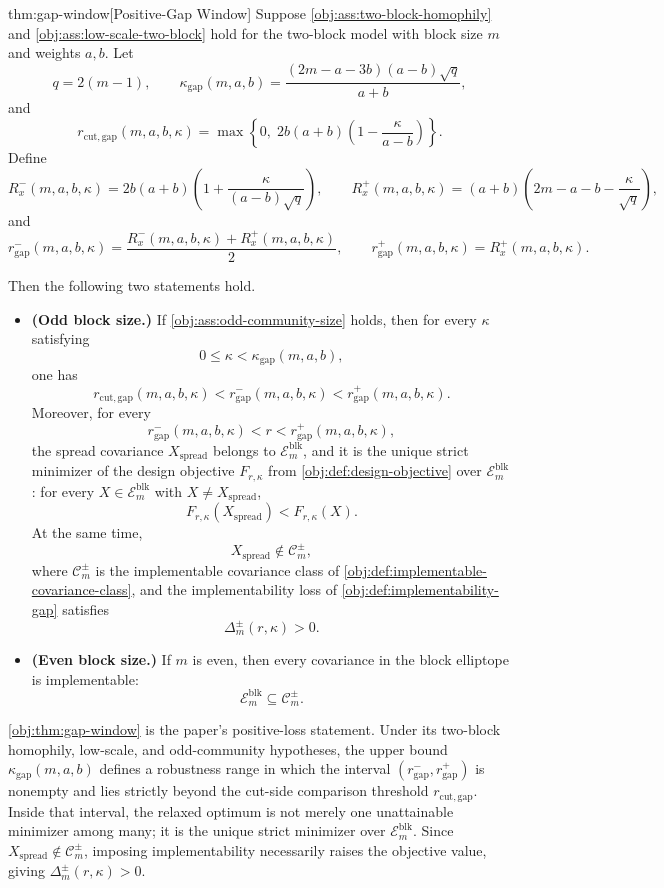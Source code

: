 \documentclass[11pt]{article}
\begin{document}
\begin{theoremv}{thm:gap-window}[Positive-Gap Window]
Suppose \cref{obj:ass:two-block-homophily} and \cref{obj:ass:low-scale-two-block} hold for the two-block model with block size \(m\) and weights \(a,b\). Let
\[
q=2(m-1),\qquad
\kappa_{\mathrm{gap}}(m,a,b)
=
\frac{(2m-a-3b)(a-b)\sqrt q}{a+b},
\]
and
\[
r_{\mathrm{cut,gap}}(m,a,b,\kappa)
=
\max\left\{0,\;2b(a+b)\left(1-\frac{\kappa}{a-b}\right)\right\}.
\]
Define
\[
R_x^-(m,a,b,\kappa)
=
2b(a+b)\left(1+\frac{\kappa}{(a-b)\sqrt q}\right),
\qquad
R_x^+(m,a,b,\kappa)
=
(a+b)\left(2m-a-b-\frac{\kappa}{\sqrt q}\right),
\]
and
\[
r_{\mathrm{gap}}^-(m,a,b,\kappa)
=
\frac{R_x^-(m,a,b,\kappa)+R_x^+(m,a,b,\kappa)}{2},
\qquad
r_{\mathrm{gap}}^+(m,a,b,\kappa)
=
R_x^+(m,a,b,\kappa).
\]

Then the following two statements hold.
\begin{itemize}
\item \textbf{(Odd block size.)} If \cref{obj:ass:odd-community-size} holds, then for every \(\kappa\) satisfying
\[
0\le \kappa < \kappa_{\mathrm{gap}}(m,a,b),
\]
one has
\[
r_{\mathrm{cut,gap}}(m,a,b,\kappa)
<
r_{\mathrm{gap}}^-(m,a,b,\kappa)
<
r_{\mathrm{gap}}^+(m,a,b,\kappa).
\]
Moreover, for every
\[
r_{\mathrm{gap}}^-(m,a,b,\kappa)
<
r
<
r_{\mathrm{gap}}^+(m,a,b,\kappa),
\]
the spread covariance \(X_{\mathrm{spread}}\) belongs to \(\mathcal E_m^{\mathrm{blk}}\), and it is the unique strict minimizer of the design objective \(F_{r,\kappa}\) from \cref{obj:def:design-objective} over \(\mathcal E_m^{\mathrm{blk}}\): for every \(X\in \mathcal E_m^{\mathrm{blk}}\) with \(X\ne X_{\mathrm{spread}}\),
\[
F_{r,\kappa}(X_{\mathrm{spread}})<F_{r,\kappa}(X).
\]
At the same time,
\[
X_{\mathrm{spread}}\notin \mathcal C_m^{\pm},
\]
where \(\mathcal C_m^{\pm}\) is the implementable covariance class of \cref{obj:def:implementable-covariance-class}, and the implementability loss of \cref{obj:def:implementability-gap} satisfies
\[
\Delta_m^{\pm}(r,\kappa)>0.
\]

\item \textbf{(Even block size.)} If \(m\) is even, then every covariance in the block elliptope is implementable:
\[
\mathcal E_m^{\mathrm{blk}}\subseteq \mathcal C_m^{\pm}.
\]
\end{itemize}
\end{theoremv}

\cref{obj:thm:gap-window} is the paper's positive-loss statement. Under its two-block homophily, low-scale, and odd-community hypotheses, the upper bound \(\kappa_{\mathrm{gap}}(m,a,b)\) defines a robustness range in which the interval \((r_{\mathrm{gap}}^-,r_{\mathrm{gap}}^+)\) is nonempty and lies strictly beyond the cut-side comparison threshold \(r_{\mathrm{cut,gap}}\). Inside that interval, the relaxed optimum is not merely one unattainable minimizer among many; it is the unique strict minimizer over \(\mathcal E_m^{\mathrm{blk}}\). Since \(X_{\mathrm{spread}}\notin\mathcal C_m^{\pm}\), imposing implementability necessarily raises the objective value, giving \(\Delta_m^{\pm}(r,\kappa)>0\).
\end{document}
